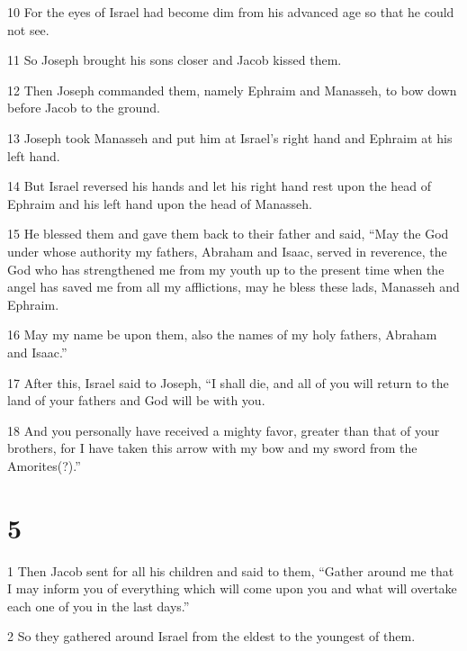 \par 10 For the eyes of Israel had become dim from his advanced age so that he could not see. 

\par 11 So Joseph brought his sons closer and Jacob kissed them. 

\par 12 Then Joseph commanded them, namely Ephraim and Manasseh, to bow down before Jacob to the ground. 

\par 13 Joseph took Manasseh and put him at Israel’s right hand and Ephraim at his left hand. 

\par 14 But Israel reversed his hands and let his right hand rest upon the head of Ephraim and his left hand upon the head of Manasseh. 

\par 15 He blessed them and gave them back to their father and said, “May the God under whose authority my fathers, Abraham and Isaac, served in reverence, the God who has strengthened me from my youth up to the present time when the angel has saved me from all my afflictions, may he bless these lads, Manasseh and Ephraim. 

\par 16 May my name be upon them, also the names of my holy fathers, Abraham and Isaac.”

\par 17 After this, Israel said to Joseph, “I shall die, and all of you will return to the land of your fathers and God will be with you. 

\par 18 And you personally have received a mighty favor, greater than that of your brothers, for I have taken this arrow with my bow and my sword from the Amorites(?).”

\chapter{5}

\par 1 Then Jacob sent for all his children and said to them, “Gather around me that I may inform you of everything which will come upon you and what will overtake each one of you in the last days.” 

\par 2 So they gathered around Israel from the eldest to the youngest of them. 

